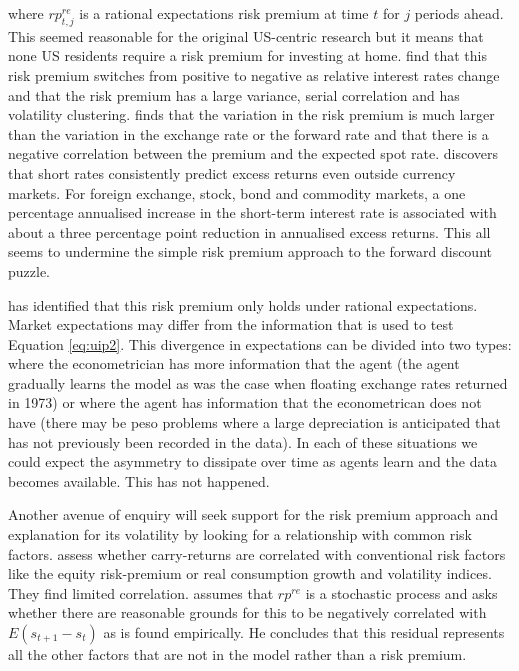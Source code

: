 \documentclass[12pt, a4paper, oneside]{article}\usepackage[]{graphicx}\usepackage[]{color}
\begin{document}
where $rp^{re}_{t, j}$ is a rational expectations risk premium at time $t$ for $j$ periods ahead.  This seemed reasonable for the original US-centric research but it means that none US residents require a risk premium for investing at home.   \citet{CanovaMarrinan} find that this risk premium switches from positive to negative as relative interest rates change and that the risk premium has a large variance, serial correlation and has volatility clustering.  \citet{FamaUIP} finds that the variation in the risk premium is much larger than the variation in the exchange rate or the forward rate and that there is a negative correlation between the premium and the expected spot rate.    \citet{FrootUIP} discovers that short rates consistently predict excess returns even outside currency markets.  For foreign exchange, stock, bond and commodity markets, a one percentage annualised increase in the short-term interest rate is associated with about a three percentage point reduction in annualised excess returns. This all seems to undermine the simple risk premium approach to the forward discount puzzle. 

\citet{Engel1996} has identified that this risk premium only holds under rational expectations. Market expectations may differ from the information that is used to test Equation \ref{eq:uip2}. This divergence in expectations can be divided into two types: where the econometrician has more information that the agent (the agent gradually learns the model as was the case when floating exchange rates returned in 1973) or where the agent has information that the econometrican does not have (there may be peso problems where a large depreciation is anticipated that has not previously been recorded in the data).  In each of these situations we could expect the asymmetry to dissipate over time as agents learn and the data becomes available. This has not happened. 

Another avenue of enquiry will seek support for the risk premium approach and explanation for its volatility by looking for a relationship with common risk factors.  \citet{Burnside2010} assess whether carry-returns are correlated with conventional risk factors like the equity risk-premium or real consumption growth and volatility indices.  They find limited correlation. \citet{McCallum} assumes that $rp^{re}$ is a stochastic process and asks whether there are reasonable grounds for this to be negatively correlated with $E(s_{t+1}-s_t)$ as is found empirically.  He concludes that this residual represents all the other factors that are not in the model rather than a risk premium.   
\end{document}
